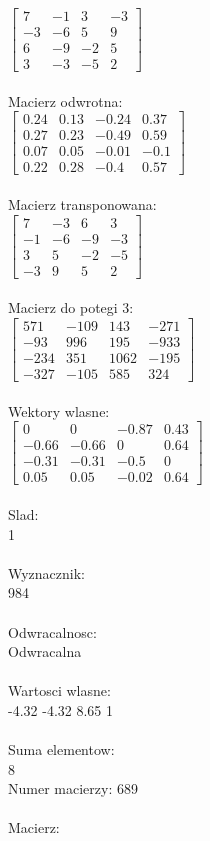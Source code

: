 \documentclass[a4paper,12pt]{article}
\begin{document}
$\begin{bmatrix} 7&-1&3&-3\\-3&-6&5&9\\6&-9&-2&5\\3&-3&-5&2 \end{bmatrix}$
\\
\\
Macierz odwrotna:\\

$\begin{bmatrix} 0.24&0.13&-0.24&0.37\\0.27&0.23&-0.49&0.59\\0.07&0.05&-0.01&-0.1\\0.22&0.28&-0.4&0.57 \end{bmatrix}$
\\
\\
Macierz transponowana:\\

$\begin{bmatrix} 7&-3&6&3\\-1&-6&-9&-3\\3&5&-2&-5\\-3&9&5&2 \end{bmatrix}$
\\
\\
Macierz do potegi 3:\\

$\begin{bmatrix} 571&-109&143&-271\\-93&996&195&-933\\-234&351&1062&-195\\-327&-105&585&324 \end{bmatrix}$
\\
\\
Wektory wlasne:\\

$\begin{bmatrix} 0&0&-0.87&0.43\\-0.66&-0.66&0&0.64\\-0.31&-0.31&-0.5&0\\0.05&0.05&-0.02&0.64 \end{bmatrix}$
\\
\\
Slad:\\
1
\\
\\
Wyznacznik:\\
984
\\
\\
Odwracalnosc:\\
Odwracalna
\\
\\
Wartosci wlasne:\\
-4.32 -4.32 8.65 1
\\
\\
Suma elementow:\\
8
\\
\newpage
Numer macierzy:
689
\\
\\
Macierz:\\
\end{document}
